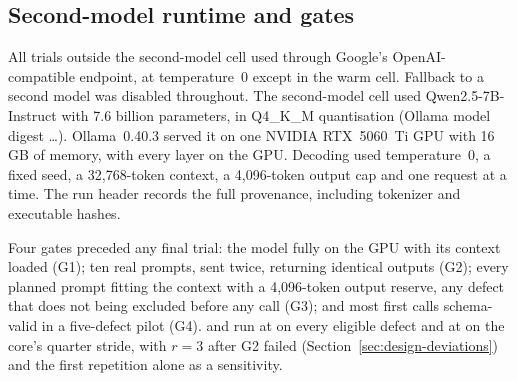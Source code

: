 \subsection{Second-model runtime and gates}
\label{app:runtime}
All trials outside the second-model cell used \model{} through Google's
OpenAI-compatible endpoint, at temperature~0 except in the warm cell. Fallback
to a second model was disabled throughout. The second-model cell used
Qwen2.5-7B-Instruct with 7.6 billion parameters, in Q4\_K\_M quantisation
(Ollama model digest \ldots). Ollama~0.40.3 served it on
one NVIDIA RTX~5060~Ti GPU with 16\,GB of memory, with every layer on the GPU.
Decoding used temperature~0, a fixed seed, a 32{,}768-token context, a
4{,}096-token output cap and one request at a time. The run header records the
full provenance, including tokenizer and executable hashes.


Four gates preceded any final trial: the model fully on the GPU with its
  context loaded (G1); ten real  prompts, sent twice, returning
  identical outputs (G2); every planned prompt fitting the context with a
  4{,}096-token output reserve, any defect that does not being excluded before
  any call (G3); and most first calls schema-valid in a five-defect pilot (G4).
   and  run at  on every eligible defect and 
  at  on the core's quarter stride, with $r=3$ after G2 failed
  (Section~\ref{sec:design-deviations}) and the first repetition alone as a
  sensitivity.
